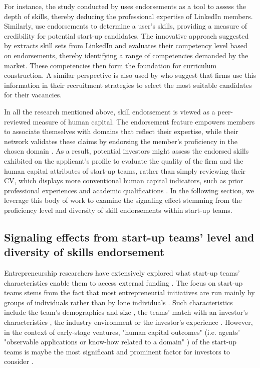 \documentclass[12pt]{article}
\begin{document}
For instance, the study conducted by \citep{yan2019social} uses endorsements as a tool to assess the depth of skills, thereby deducing the professional expertise of LinkedIn members. Similarly, \citep{drakopoulos2020building} use endorsements to determine a user's skills, providing a measure of credibility for potential start-up candidates. The innovative approach suggested by \citep{constantinov2015preliminary} extracts skill sets from LinkedIn and evaluates their competency level based on endorsements, thereby identifying a range of competencies demanded by the market. These competencies then form the foundation for curriculum construction. A similar perspective is also used by \citet{wu2018analysis} who suggest that firms use this information in their recruitment strategies to select the most suitable candidates for their vacancies.

In all the research mentioned above, skill endorsement is viewed as a peer-reviewed measure of human capital. The endorsement feature empowers members to associate themselves with domains that reflect their expertise, while their network validates these claims by endorsing the member's proficiency in the chosen domain \citep{perez2016endorsement}. As a result, potential investors might assess the endorsed skills exhibited on the applicant's profile to evaluate the quality of the firm and the human capital attributes of start-up teams, rather than simply reviewing their CV, which displays more conventional human capital indicators, such as prior professional experiences and academic qualifications \citep{gasiorowski2022pay}. In the following section, we leverage this body of work to examine the signaling effect stemming from the proficiency level and diversity of skill endorsements within start-up teams.

\subsection{Signaling effects from start-up teams' level and diversity of skills endorsement}

Entrepreneurship researchers have extensively explored what start-up teams' characteristics enable them to access external funding \citep{roure1990predictors}. The focus on start-up teams stems from the fact that most entrepreneurial initiatives are run mainly by groups of individuals rather than by lone individuals \citep{klotz2014new}. Such characteristics include the team's demographics and size \citep{eisenhardt1990organizational}, the teams' match with an investor's characteristics \citep{aggarwal2015evaluating}, the industry environment \citep{townsend2015turning} or the investor's experience \citep{franke2008venture}. However, in the context of early-stage ventures, "human capital outcomes" (i.e. agents’ "observable applications or know-how related to a domain" \citep{becker1964human, marvel2016human}) of the start-up teams is maybe the most significant and prominent factor for investors to consider \citep{beckman2007early, ko2018signaling, matusik2008values}.
\end{document}
